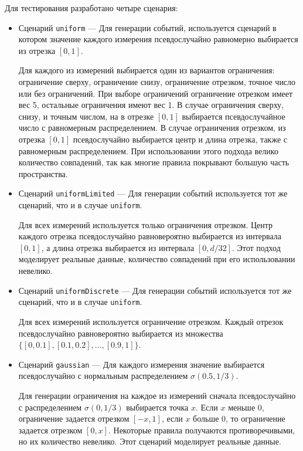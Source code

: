 \documentclass[14pt]{article}
\begin{document}
Для тестирования разработано четыре сценария:
\begin{itemize}
    \item Сценарий \verb|uniform| --- Для генерации событий, используется сценарий в котором значение каждого измерения псевдослучайно равномерно выбирается из отрезка $[0, 1]$.
    
    Для каждого из измерений выбирается один из вариантов ограничения: ограничение сверху, ограничение снизу, ограничение отрезком, точное число или без ограничений. При выборе ограничений ограничение отрезком имеет вес 5, остальные ограничения имеют вес 1. В случае ограничения сверху, снизу, и точным числом, на в отрезке $[0, 1]$ выбирается псевдослучайное число с равномерным распределением. В случае ограничения отрезком, из отрезка $[0, 1]$ псевдослучайно выбирается центр и длина отрезка, также с равномерным распределением. При использовании этого подхода велико количество совпадений, так как многие правила покрывают большую часть пространства.
    
    \item Сценарий \verb|uniformLimited| --- Для генерации событий используется тот же сценарий, что и в случае \verb|uniform|.
    
    Для всех измерений используется только ограничения отрезком. Центр каждого отрезка псевдослучайно равновероятно выбирается из интервала $[0, 1]$, а длина отрезка выбирается из интервала $[0, d / 32]$. Этот подход моделирует реальные данные, количество совпадений при его использовании невелико.

    \item Сценарий \verb|uniformDiscrete| --- Для генерации событий используется тот же сценарий, что и в случае \verb|uniform|.
    
    Для всех измерений используется ограничение отрезком. Каждый отрезок псевдослучайно равновероятно выбирается из множества\\ $\{[0, 0.1], [0.1, 0.2],\dots,[0.9, 1]\}$.
    
    \item Сценарий \verb|gaussian| --- Для каждого измерения значение выбирается псевдослучайно с нормальным распределением $\sigma(0.5, 1/3)$.
    
    Для генерации ограничения на каждое из измерений сначала псевдослучайно с распределением $\sigma(0, 1/3)$ выбирается точка $x$. Если $x$ меньше 0, ограничение задается отрезком $[-x, 1]$, если $x$ больше 0, то ограничение задается отрезком $[0, x]$. Некоторые правила получаются противоречивыми, но их количество невелико. Этот сценарий моделирует реальные данные.

\end{itemize}
\end{document}
